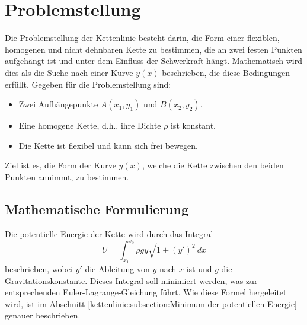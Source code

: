 %
%
%
%
\section{Problemstellung\label{kettenlinie:section:Problemstellung}}
Die Problemstellung der Kettenlinie besteht darin, die Form einer flexiblen, homogenen und nicht dehnbaren Kette zu bestimmen, die an zwei festen Punkten aufgehängt ist und unter dem Einfluss der Schwerkraft hängt.
Mathematisch wird dies als die Suche nach einer Kurve \( y(x) \) beschrieben, die diese Bedingungen erfüllt.
Gegeben für die Problemstellung sind: 
\begin{itemize}
\item
Zwei Aufhängepunkte \( A(x_1, y_1) \) und \( B(x_2, y_2) \).
\item
Eine homogene Kette, d.h., ihre Dichte \( \rho \) ist konstant.
\item
Die Kette ist flexibel und kann sich frei bewegen.
\end{itemize}
Ziel ist es, die Form der Kurve \( y(x) \), welche die Kette zwischen den beiden Punkten annimmt, zu bestimmen.

\subsection{Mathematische Formulierung
\label{kettenlinie:subsection:Mathematische Formulierung}}
Die potentielle Energie der Kette wird durch das Integral
\begin{equation}
	U = \int_{x_1}^{x_2} \rho g y \sqrt{1 + (y')^2} \, dx
\end{equation}
beschrieben, wobei \( y' \) die Ableitung von \( y \) nach \( x \) ist und \( g \) die Gravitationskonstante.
Dieses Integral soll minimiert werden, was zur entsprechenden Euler-Lagrange-Gleichung führt.
Wie diese Formel hergeleitet wird, ist im Abschnitt \ref{kettenlinie:subsection:Minimum der potentiellen Energie} genauer beschrieben.


